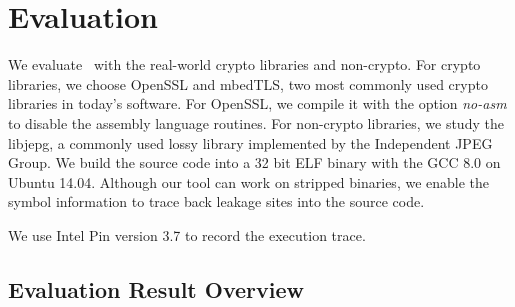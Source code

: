 \section{Evaluation}
We evaluate \tana\ with the real-world crypto libraries and non-crypto. 
For crypto libraries, we choose OpenSSL and mbedTLS, two most commonly used
crypto libraries in today's software. For OpenSSL, we compile it with the option \textit{no-asm} 
to disable the assembly language routines. For non-crypto libraries, 
we study the libjepg, a commonly used lossy library implemented by 
the Independent JPEG Group. We build the source code into a 32 bit 
ELF binary with the GCC 8.0 on Ubuntu 14.04. Although our tool can
work on stripped binaries, we enable the symbol information to trace
back leakage sites into the source code.

We use Intel Pin version 3.7 to record the execution trace.

\subsection{Evaluation Result Overview}